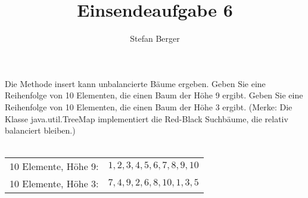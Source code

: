\documentclass{article}
\begin{document}
\title{Einsendeaufgabe 6}
\author{\normalsize Stefan Berger}
\date{}
\maketitle

\setcounter{subsection}{2}
\subsection{}
Die Methode insert kann unbalancierte Bäume ergeben. Geben Sie eine Reihenfolge von 10 
Elementen, die einen Baum der Höhe 9 ergibt.  Geben Sie eine Reihenfolge von 10 Elementen, die 
einen Baum der Höhe 3 ergibt.  (Merke: Die Klasse java.util.TreeMap implementiert die Red-Black 
Suchbäume, die relativ balanciert bleiben.)\\\\
\begin{tabular}{ll}
10 Elemente, Höhe 9: &$1, 2, 3, 4, 5, 6, 7, 8, 9, 10$\\
10 Elemente, Höhe 3: &$7, 4, 9, 2, 6, 8, 10, 1, 3, 5$\\
\end{tabular}

\end{document}
